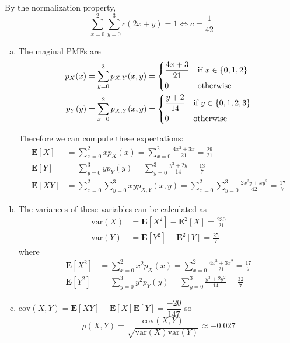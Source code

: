 \documentclass[a4paper,12pt]{article}
\newcommand{\E}{\mathbf E}
\newcommand{\var}{\mathrm{var}}
\newcommand{\cov}{\mathrm{cov}}
\begin{document}
By the normalization property,
\[\sum_{x=0}^2\sum_{y=0}^3 c(2x + y) = 1 \iff c = \frac{1}{42}\]
\begin{enumerate}[(a)]
  \item The maginal PMFs are
    \begin{align*}
      p_X(x) &= \sum_{y=0}^3 p_{X,Y}(x, y) = \begin{dcases}
        \frac{4x + 3}{21} &\text{if }x \in \{0, 1, 2\}\\
        0 &\text{otherwise}
      \end{dcases}\\
      p_Y(y) &= \sum_{x=0}^2 p_{X,Y}(x, y) = \begin{dcases}
        \frac{y + 2}{14} &\text{if }y \in \{0, 1, 2, 3\}\\
        0 &\text{otherwise}
      \end{dcases}
    \end{align*}

    Therefore we can compute these expectations:
    \begin{align*}
      \E[X] &= \sum_{x=0}^2 x p_X(x)
      = \sum_{x=0}^2\frac{4x^2 + 3x}{21} = \frac{29}{21}\\
      \E[Y] &= \sum_{y=0}^3 y p_Y(y)
      = \sum_{y=0}^3\frac{y^2 + 2y}{14} = \frac{13}{7}\\
      \E[XY] &= \sum_{x=0}^2\sum_{y=0}^3 xy p_{X,Y}(x,y)
      = \sum_{x=0}^2\sum_{y=0}^3\frac{2x^2 y + xy^2}{42} = \frac{17}{7}
    \end{align*}
  \item The variances of these variables can be calculated as
    \begin{align*}
      \var(X) &= \E\left[X^2\right] - \E^2[X] = \frac{230}{21}\\
      \var(Y) &= \E\left[Y^2\right] - \E^2[Y] = \frac{25}{7}
    \end{align*}
    where
    \begin{align*}
      \E\left[X^2\right] &= \sum_{x=0}^2 x^2 p_X(x)
      = \sum_{x=0}^2\frac{4x^3 + 3x^2}{21} = \frac{17}{7}\\
      \E\left[Y^2\right] &= \sum_{y=0}^3 y^2 p_Y(y)
      = \sum_{y=0}^3\frac{y^3 + 2y^2}{14} = \frac{32}{7}
    \end{align*}
  \item $\cov(X, Y) = \E[XY] - \E[X]\E[Y] = \dfrac{-20}{147}$ so
    \[\rho(X, Y) = \dfrac{\cov(X, Y)}{\sqrt{\var(X)\var(Y)}} \approx -0.027\]
\end{enumerate}
\end{document}
